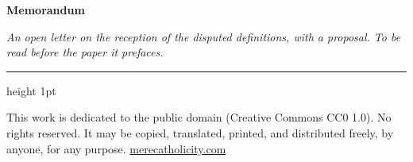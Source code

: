 \documentclass[11pt,letterpaper]{article}
\begin{document}
\color{ink}

\begin{center}
{\LARGE\bfseries\color{heading} Memorandum\par}
\vspace{0.8em}
{\itshape\color{subhead} An open letter on the reception of the disputed
definitions, with a proposal. To be read before the paper it prefaces.\par}
\vspace{0.5em}
{\color{accent}\hrule height 1pt}
\end{center}
\vspace{1em}



\vspace{2em}
{\small\noindent This work is dedicated to the public domain (Creative
Commons CC0 1.0). No rights reserved. It may be copied, translated,
printed, and distributed freely, by anyone, for any purpose.
\href{https://merecatholicity.com}{merecatholicity.com}\par}
\end{document}
